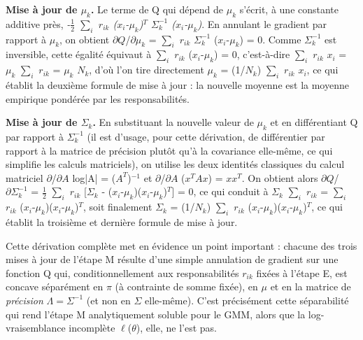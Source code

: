 \textbf{Mise à jour de $\mu _{k}$. }Le terme de Q qui dépend de $\mu _{k}$ s'écrit, à une constante additive près, \emph{-$\tfrac{1}{2}$ $\sum_{i}$ $r_{ik}$ ($x_{i}$-$\mu _{k}$)$^{T}$ $\Sigma _{k}^{-1}$ ($x_{i}$-$\mu _{k}$)}. En annulant le gradient par rapport à $\mu _{k}$, on obtient $\partial Q$/$\partial \mu _{k}$ = $\sum_{i}$ $r_{ik}$ $\Sigma _{k}^{-1}$ ($x_{i}$-$\mu _{k}$) = 0. Comme $\Sigma _{k}^{-1}$ est inversible, cette égalité équivaut à $\sum_{i}$ $r_{ik}$ ($x_{i}$-$\mu _{k}$) = 0, c'est-à-dire $\sum_{i}$ $r_{ik}$ $x_{i}$ = $\mu _{k}$ $\sum_{i}$ $r_{ik}$ = $\mu _{k}$ $N_{k}$, d'où l'on tire directement $\mu _{k}$ = (1/$N_{k}$) $\sum_{i}$ $r_{ik}$ $x_{i}$, ce qui établit la deuxième formule de mise à jour : la nouvelle moyenne est la moyenne empirique pondérée par les responsabilités.

\textbf{Mise à jour de $\Sigma _{k}$. }En substituant la nouvelle valeur de $\mu _{k}$ et en différentiant Q par rapport à $\Sigma _{k}^{-1}$ (il est d'usage, pour cette dérivation, de différentier par rapport à la matrice de précision plutôt qu'à la covariance elle-même, ce qui simplifie les calculs matriciels), on utilise les deux identités classiques du calcul matriciel $\partial $/$\partial A$ log|A| = ($A^{T}$)$^{-1}$ et $\partial $/$\partial A$ ($x^{T}Ax$) = $xx^{T}$. On obtient alors $\partial Q$/$\partial \Sigma _{k}^{-1}$ = $\tfrac{1}{2}$ $\sum_{i}$ $r_{ik}$ [$\Sigma _{k}$ - ($x_{i}$-$\mu _{k}$)($x_{i}$-$\mu _{k}$)$^{T}$] = 0, ce qui conduit à $\Sigma _{k}$ $\sum_{i}$ $r_{ik}$ = $\sum_{i}$ $r_{ik}$ ($x_{i}$-$\mu _{k}$)($x_{i}$-$\mu _{k}$)$^{T}$, soit finalement $\Sigma _{k}$ = (1/$N_{k}$) $\sum_{i}$ $r_{ik}$ ($x_{i}$-$\mu _{k}$)($x_{i}$-$\mu _{k}$)$^{T}$, ce qui établit la troisième et dernière formule de mise à jour.

Cette dérivation complète met en évidence un point important : chacune des trois mises à jour de l'étape M résulte d'une simple annulation de gradient sur une fonction Q qui, conditionnellement aux responsabilités $r_{ik}$ fixées à l'étape E, est concave séparément en $\pi$ (à contrainte de somme fixée), en $\mu$ et en la matrice de \emph{précision} $\Lambda = \Sigma^{-1}$ (et non en $\Sigma$ elle-même). C'est précisément cette séparabilité qui rend l'étape M analytiquement soluble pour le GMM, alors que la log-vraisemblance incomplète $\ell $($\theta $), elle, ne l'est pas.

